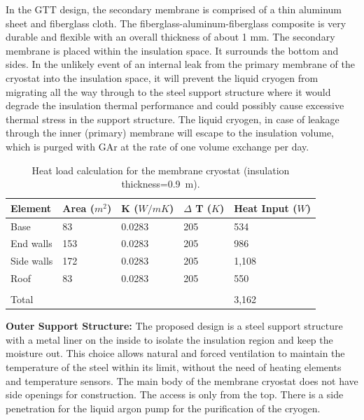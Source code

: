 In the GTT design, the secondary membrane is comprised of a thin aluminum sheet and 
fiberglass cloth. The fiberglass-aluminum-fiberglass composite is very durable and flexible with an 
overall thickness of about 1 mm. The secondary membrane is placed within the insulation space. It 
surrounds the bottom and sides. In the unlikely event of an internal leak from the primary membrane of 
the cryostat into the insulation space, it will prevent the liquid cryogen from migrating all the way 
through to the steel support structure where it would degrade the insulation thermal performance and 
could possibly cause excessive thermal stress in the support structure. The liquid cryogen, in case of 
leakage through the inner (primary) membrane will escape to the insulation volume, which is purged with 
GAr at the rate of one volume exchange per day.

\begin{table}[htpb]
\centering
\begin{tabular}{|p{}|p{}|p{}|p{}|p{}|}
\hline
 \textbf{Element} & \textbf{Area ($m^2$)}  &  \textbf{K ($W/mK$)} & \textbf{$\Delta$ T ($K$)}
 & \textbf{Heat Input ($W$)}\\ \hline
Base   & 83  & 0.0283   &205   & 534 \\ \hline
End walls  &  153 & 0.0283  &  205 &  986 \\ \hline
Side walls   & 172  & 0.0283  &  205 & 1,108 \\ \hline
Roof  &  83 & 0.0283  & 205  &  550\\ \hline
   &   &   &   &  \\ \hline
Total   &   &   &   & 3,162 \\ \hline
\end{tabular}
\caption{Heat load calculation for the membrane cryostat (insulation thickness=0.9~m). }
\label{tbl:heat-load-calc}
\end{table}


\textbf{Outer Support Structure:}
%
The proposed design is a steel support structure with a metal liner on the inside to isolate the insulation region and keep the moisture out. This choice allows natural and forced ventilation to maintain the temperature of the steel within its limit, without the need of heating elements and temperature sensors. 
The main body of the membrane cryostat does not have side openings for construction. The access is only from the top. There is a side penetration for the liquid argon pump for the purification of the cryogen.

